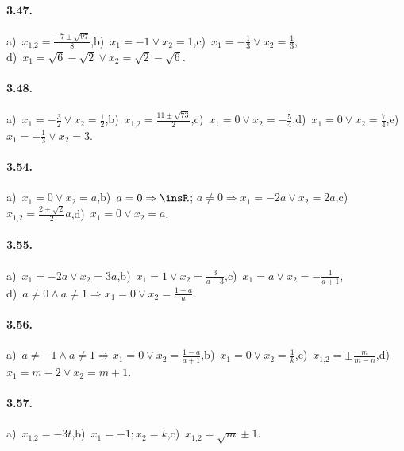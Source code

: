 \paragraph{3.47.} a)~$x_{1\text{,}2} = \frac{- 7 \pm \sqrt{97}}{8}$,\quad b)~$x_{1} =-1 \vee x_{2} = 1$,\quad c)~$x_{1} =-\frac{1}{3} \vee x_{2} = \frac{1}{3}$,\protect \\ \quad d)~$x_{1} = \sqrt{6}-\sqrt{2} \vee x_{2} = \sqrt{2}-\sqrt{6}$.

\paragraph{3.48.} a)~$x_{1} =-\frac{3}{2} \vee x_{2} = \frac{1}{2}$,\quad b)~$x_{1\text{,}2} = \frac{11 \pm \sqrt{73}}{2}$,\quad c)~$x_{1} = 0 \vee x_{2} =-\frac{5}{4}$,\quad d)~$x_{1} = 0 \vee x_{2} = \frac{7}{4}$,\quad e)~$x_{1} =-\frac{1}{3} \vee x_{2} = 3$.

\paragraph{3.54.} a)~$x_{1} = 0 \vee x_{2} = a$,\quad b)~$a = 0 \Rightarrow \insR$; $a \neq 0 \Rightarrow x_{1}=-2 a \vee x_{2} = 2 a$,\quad c)~$x_{1\text{,}2} = \frac{2\pm\sqrt{2}}{2} a$,\quad d)~$x_{1} = 0 \vee x_{2} = a$.

\paragraph{3.55.} a)~$x_{1} =-2 a \vee x_{2} = 3 a$,\quad b)~$x_{1} = 1 \vee x_{2} = \frac{3}{a-3}$,\quad c)~$x_{1} = a \vee x_{2} =-\frac{1}{a + 1}$,\protect\\ \quad d)~$a \neq 0 \wedge a \neq 1 \Rightarrow x_{1} = 0 \vee x _{2} = \frac{1-a}{a}$.

\paragraph{3.56.} a)~$a \neq-1 \wedge a \neq 1 \Rightarrow x_{1} = 0 \vee x_{2} = \frac{1-a}{a + 1}$,\quad b)~$x_{1} = 0 \vee x_{2} = \frac{1}{k}$,\quad c)~$x_{1\text{,}2} = \pm \frac{m}{m-n}$,\quad d)~$x_{1} = m-2 \vee x_{2} = m + 1$.

\paragraph{3.57.} a)~$x_{1\text{,}2} =-3t$,\quad b)~$x_{1} =-1;x_{2} = k$,\quad c)~$x_{1\text{,}2} = \sqrt{m} \pm 1$.


